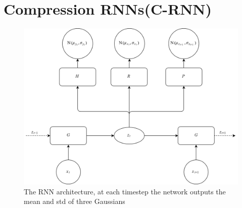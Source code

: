 \documentclass[../main.tex]{subfiles}
\begin{document}




\section{Compression RNNs(C-RNN)}
\label{sec:model}

\begin{figure}
    \centering
    \label{fig:architecture}
    \includegraphics[width=\textwidth]{Approach/rnn_architecture.png}
    \caption{The RNN architecture, at each timestep the network outputs the mean and std of three Gaussians}
\end{figure}
\end{document}
